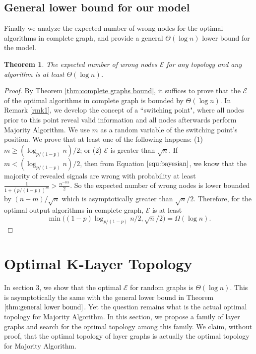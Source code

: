\documentclass[a4paper,UKenglish]{lipics}
\newtheorem{thm}{Theorem}[section] %
\theoremstyle{definition}
\begin{document}
\subsection{General lower bound for our model}
Finally we analyze the expected number of wrong nodes for the optimal algorithms in complete graph, 
	and provide a general $\Theta(\log n)$ lower bound for the model.
	
\begin{thm}
\label{thm:general lower bound}
The expected number of wrong nodes $\mathcal{E}$ for any topology and any algorithm is at least $\Theta(\log n)$.
\end{thm}

\begin{proof}
By Theorem \ref{thm:complete graphs bound}, it suffices to prove that 
	the $\mathcal{E}$ of the optimal algorithms in complete graph is bounded by $\Theta(\log n)$.
In Remark \ref{rmk1}, we develop the concept of a ``switching point", 
	where all nodes prior to this point reveal valid information and all nodes afterwards perform Majority Algorithm.
We use $m$ as a random variable of the switching point's position.
We prove that at least one of the following happens:
(1) $m\geq (\log_{p/(1-p)}n) / 2$;  or
(2) $\mathcal{E}$ is greater than $\sqrt{n}$.
If $m < (\log_{p/(1-p)}n) / 2$, then from Equation $\eqref{equ:bayesian}$, we know that the majority of revealed signals are wrong
	with probability at least 
	$
	\frac{1}{1 + (p/(1-p))^m} 
	> 
	\frac{n^{-0.5}}{2}.
	$
So the expected number of wrong nodes is lower bounded by $ {(n-m)} / {\sqrt{n}}$ which is asymptotically greater than ${\sqrt{n}}/2$. 
Therefore, for the optimal output algorithms in complete graph, $\mathcal{E}$ is at least
\begin{equation*}
	\min \Big((1 - p) \log_{p/(1-p)}n \Big/ 2,  \sqrt{n} \Big/2 \Big) 
	= 
	\Omega(\log n).
\end{equation*}
\end{proof}









\section {Optimal K-Layer Topology}

In section 3, we show that the optimal $\mathcal{E}$ for random graphs is $\Theta(\log n)$.
This is asymptotically the same with the general lower bound in Theorem $\ref{thm:general lower bound}$.
Yet the question remains what is the actual optimal topology for Majority Algorithm.
In this section, we propose a family of layer graphs and search for the optimal topology among this family.
We claim, without proof, that the optimal topology of layer graphs is actually the optimal topology for Majority Algorithm.
\end{document}
